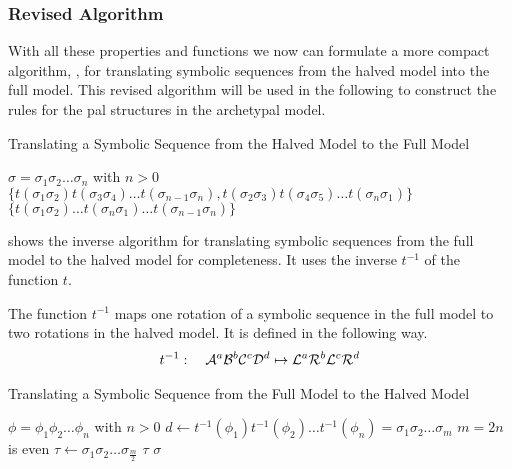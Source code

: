 \subsubsection{Revised Algorithm}

With all these properties and functions we now can formulate a more compact algorithm, , for translating symbolic sequences from the halved model into the full model.
This revised algorithm will be used in the following to construct the rules for the \gls{pal} structures in the archetypal model.

\begin{algorithm}
	\caption{Translating a Symbolic Sequence from the Halved Model to the Full Model}\label{alg:halved.to.full}
	\begin{algorithmic}
		\Require $\sigma = \sigma_1\sigma_2 \dots \sigma_n$ with $n > 0$
		\State \Return $\{t(\sigma_1\sigma_2) t(\sigma_3\sigma_4) \dots t(\sigma_{n-1}\sigma_n), t(\sigma_2\sigma_3) t(\sigma_4\sigma_5) \dots t(\sigma_n\sigma_1)\}$
		\State \Return $\{t(\sigma_1\sigma_2) \dots t(\sigma_{n}\sigma_1) \dots t(\sigma_{n-1}\sigma_n)\}$
		\EndIf
	\end{algorithmic}
\end{algorithm}

 shows the inverse algorithm for translating symbolic sequences from the full model to the halved model for completeness.
It uses the inverse $t^{-1}$ of the function $t$.

\begin{definition}
	The function $t^{-1}$ maps one rotation of a symbolic sequence in the full model to two rotations in the halved model.
	It is defined in the following way.
	\begin{align}
		t^{-1}: \quad \mathcal{A}^a\mathcal{B}^b\mathcal{C}^c\mathcal{D}^d \mapsto \mathcal{L}^a\mathcal{R}^b\mathcal{L}^c\mathcal{R}^d
	\end{align}
\end{definition}

\begin{algorithm}
	\caption{Translating a Symbolic Sequence from the Full Model to the Halved Model}\label{alg:full.to.halved}
	\begin{algorithmic}
		\Require $\phi = \phi_1\phi_2 \dots \phi_n$ with $n > 0$
		\State $d \gets t^{-1}(\phi_1)t^{-1}(\phi_2) \dots t^{-1}(\phi_n) = \sigma_1\sigma_2 \dots \sigma_m$
		\Comment $m = 2n$ is even
		\State $\tau \gets \sigma_1\sigma_2 \dots \sigma_{\frac{m}{2}}$
		\If{$\sigma = \tau^2$}
		\State \Return $\tau$
		\ElsIf{$\sigma \neq \tau^2$}
		\State \Return $\sigma$
		\EndIf
	\end{algorithmic}
\end{algorithm}
